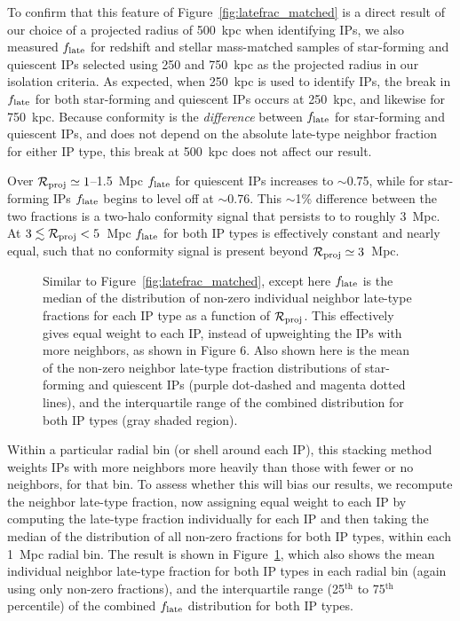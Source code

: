 To confirm that this feature of Figure~\ref{fig:latefrac_matched} is a direct result of our choice of a projected radius of 500~kpc when identifying IPs, we also measured $\flate$ for redshift and stellar mass-matched samples of star-forming and quiescent IPs selected using 250 and 750~kpc as the projected radius in our isolation criteria.  As expected, when 250~kpc is used to identify IPs, the break in $\flate$ for both star-forming and quiescent IPs occurs at 250~kpc, and likewise for 750~kpc.
Because conformity is the \emph{difference} between $\flate$ for star-forming and quiescent IPs, and does not depend on the absolute late-type neighbor fraction for either IP type, this break at 500~kpc does not affect our result.

Over $\mathcal{R}_{\text{proj}}\simeq1$--1.5~Mpc $\flate$ for quiescent IPs increases to $\sim$0.75, while for star-forming IPs $\flate$ begins to level off at $\sim$0.76.  This $\sim$1\% difference between the two fractions is a two-halo conformity signal that persists to to roughly 3~Mpc.  At $3\lesssim\mathcal{R}_{\text{proj}}<5$~Mpc $\flate$ for both IP types is effectively constant and nearly equal, such that no conformity signal is present beyond $\mathcal{R}_{\text{proj}}\simeq3$~Mpc.


\begin{figure}
  \epstrim{0.5in 0.1in 0.3in 0.3in}
  \caption{
Similar to Figure~\ref{fig:latefrac_matched}, except here $\flate$ is the median of 
the distribution of non-zero individual neighbor late-type fractions for each IP type as a function of $\mathcal{R}_{\text{proj}}$.  This effectively gives equal weight to each IP, instead of upweighting the IPs with more neighbors, as shown in Figure 6.
Also shown here is the mean of the non-zero neighbor late-type fraction distributions of star-forming and quiescent IPs (purple dot-dashed and magenta dotted lines),
and the interquartile range of the combined distribution for both IP types (gray shaded region).
}
  \label{fig:latefrac_quartiles}
\end{figure}

Within a particular radial bin (or shell around each IP), this stacking method 
weights IPs with more neighbors more heavily than those with fewer or no neighbors,
for that bin.
To assess whether this will bias our results, we recompute the neighbor late-type fraction, 
now assigning equal weight to each IP by computing the late-type fraction 
individually for each IP and then taking the median of the distribution of all 
non-zero fractions for both IP types, within each 1~Mpc radial bin.
The result is shown in Figure~\ref{fig:latefrac_quartiles}, which also shows the 
mean individual neighbor late-type fraction for both IP types in each radial bin (again using
only non-zero fractions), and the interquartile range (25$^{\textrm{th}}$ to 75$^{\textrm{th}}$ percentile) of the combined $\flate$ distribution for both IP types.

